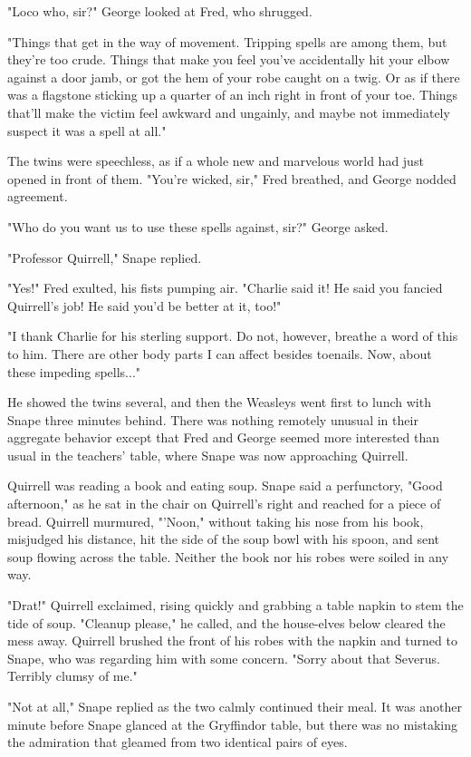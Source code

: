 "Loco who, sir?" George looked at Fred, who shrugged.

"Things that get in the way of movement. Tripping spells are among them, but they're too crude. Things that make you feel you've accidentally hit your elbow against a door jamb, or got the hem of your robe caught on a twig. Or as if there was a flagstone sticking up a quarter of an inch right in front of your toe. Things that'll make the victim feel awkward and ungainly, and maybe not immediately suspect it was a spell at all."

The twins were speechless, as if a whole new and marvelous world had just opened in front of them. "You're wicked, sir," Fred breathed, and George nodded agreement.

"Who do you want us to use these spells against, sir?" George asked.

"Professor Quirrell," Snape replied.

"Yes!" Fred exulted, his fists pumping air. "Charlie said it! He said you fancied Quirrell's job! He said you'd be better at it, too!"

"I thank Charlie for his sterling support. Do not, however, breathe a word of this to him. There are other body parts I can affect besides toenails. Now, about these impeding spells..."

He showed the twins several, and then the Weasleys went first to lunch with Snape three minutes behind. There was nothing remotely unusual in their aggregate behavior except that Fred and George seemed more interested than usual in the teachers' table, where Snape was now approaching Quirrell.

Quirrell was reading a book and eating soup. Snape said a perfunctory, "Good afternoon," as he sat in the chair on Quirrell's right and reached for a piece of bread. Quirrell murmured, "'Noon," without taking his nose from his book, misjudged his distance, hit the side of the soup bowl with his spoon, and sent soup flowing across the table. Neither the book nor his robes were soiled in any way.

"Drat!" Quirrell exclaimed, rising quickly and grabbing a table napkin to stem the tide of soup. "Cleanup please," he called, and the house-elves below cleared the mess away. Quirrell brushed the front of his robes with the napkin and turned to Snape, who was regarding him with some concern. "Sorry about that Severus. Terribly clumsy of me."

"Not at all," Snape replied as the two calmly continued their meal. It was another minute before Snape glanced at the Gryffindor table, but there was no mistaking the admiration that gleamed from two identical pairs of eyes.

